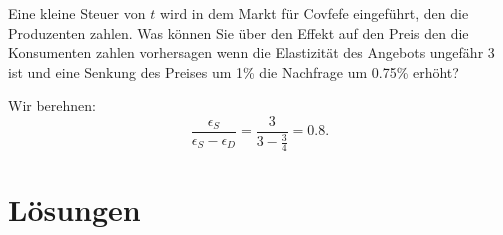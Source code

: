 \begin{question}
	Eine kleine Steuer von $t$ wird in dem Markt für Covfefe eingeführt, den die Produzenten zahlen. Was
	können Sie über den Effekt auf den Preis den die Konsumenten zahlen vorhersagen wenn die Elastizität
	des Angebots ungefähr 3 ist und eine Senkung des Preises um 1\% die Nachfrage um 0.75\% erhöht?

\end{question}
\begin{solution}

	Wir berehnen:
	\[
		\frac{\epsilon_S}{\epsilon_S- \epsilon_D} = \frac{3}{3- \frac{3}{4}} = 0.8
		.\]

\end{solution}
\clearpage
\section{Lösungen}

\printsolutions
